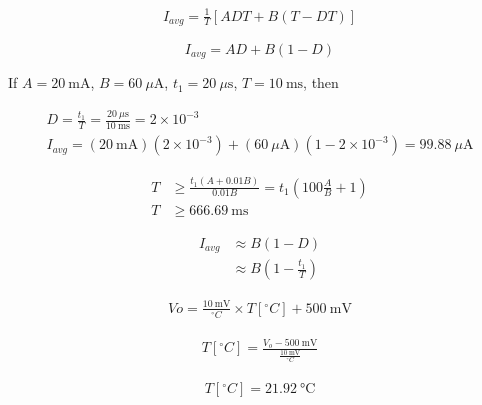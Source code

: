\documentclass{article}
\begin{document}
\begin{align}
	I_{avg} = \frac{1}{T} \left[ ADT + B(T - DT) \right] 
\end{align}

\begin{tcolorbox}[colback=red!5!white,colframe=red!75!black,arc=0mm,boxrule=0mm,width=(\linewidth+0.5cm)]
	\begin{equation}
		I_{avg} = AD + B(1 - D)
	\end{equation}
\end{tcolorbox}

If $A= \qty{20}{\milli \ampere}$, $B = \qty{60}{\mu \ampere}$, $t_1 = \qty{20}{\mu \second}$, $T = \qty{10}{\milli \second}$,  then

\begin{align}
	D = \frac{t_1}{T} = \frac{\qty{20}{\mu \second}}{\qty{10}{\milli \second}} = 2 \times 10^{-3} \\
	I_{avg} = (\qty{20}{\milli \ampere})(2 \times 10^{-3}) + (\qty{60}{\mu \ampere})(1 - 2 \times 10^{-3} ) = \qty{99.88}{\mu \ampere}
\end{align}

\begin{align}
	T &\geq \frac{t_1(A + 0.01B)}{0.01B} = t_1 \left( 100 \frac{A}{B} + 1 \right)\\
	T &\geq \qty{666.69}{\milli \second}
\end{align}

\begin{align}
	I_{avg} &\approx B(1 - D) \\
	& \approx B\left( 1 - \frac{t_1}{T} \right)
\end{align}

\begin{align}
	Vo = \frac{ \qty{10}{\milli \volt} }{  ^{\circ}C } \times T[^{\circ}C] + \qty{500}{\milli \volt}
\end{align}

\begin{align}
	T[^{\circ}C] = \frac{V_o - \qty{500}{\milli \volt}}{ \frac{ \qty{10}{\milli \volt} }{ ^{\circ}C} }
\end{align}

\begin{align}
		T[^{\circ}C] = \qty{21.92}{\degreeCelsius}
\end{align}
\end{document}
